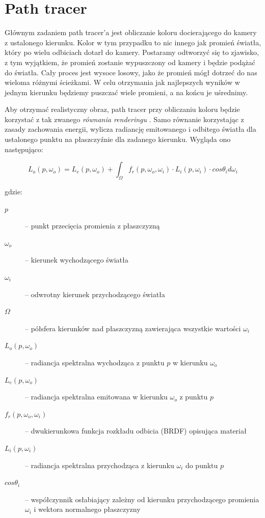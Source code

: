\documentclass[inz,shortabstract]{iithesis}
\begin{document}
    \section{Path tracer}
        Głównym zadaniem path tracer'a jest obliczanie koloru docierającego do kamery z ustalonego kierunku. Kolor w tym przypadku to nic innego jak promień światła, który po wielu odbiciach dotarł do kamery. Postaramy odtworzyć się to zjawisko, z tym wyjątkiem, że promień zostanie wypuszczony od kamery i będzie podążać do światła. Cały proces jest wysoce losowy, jako że promień mógł dotrzeć do nas wieloma różnymi ścieżkami. W celu otrzymania jak najlepszych wyników w jednym kierunku będziemy puszczać wiele promieni, a na końcu je uśrednimy.
        
        Aby otrzymać realistyczny obraz, path tracer przy obliczaniu koloru będzie korzystać z tak zwanego \textit{równania renderingu} \cite{pbrt}. Samo równanie korzystając z zasady zachowania energii, wylicza radiancję emitowanego i odbitego światła dla ustalonego punktu na płaszczyźnie dla zadanego kierunku. Wygląda ono następująco:
        
        \begin{equation*}
            L_o(p, \omega_o) = L_e(p, \omega_o) + \int_{\Omega} f_r(p, \omega_o, \omega_i) \cdot L_i(p, \omega_i) \cdot cos\theta_i d\omega_i
        \end{equation*}
        
        gdzie:
        
        \begin{description}
            \item[$p$] -- punkt przecięcia promienia z płaszczyzną
            \item[$\omega_o$] -- kierunek wychodzącego światła
            \item[$\omega_i$] -- odwrotny kierunek przychodzącego światła
            \item[$\Omega$] -- półsfera kierunków nad płaszczyzną zawierająca wszystkie wartości $\omega_i$ 
            \item[$L_o(p, \omega_o)$] -- radiancja spektralna wychodząca z punktu $p$ w kierunku $\omega_o$
            \item[$L_e(p, \omega_o)$] -- radiancja spektralna emitowana w kierunku $\omega_o$ z punktu $p$  
            \item[$f_r(p, \omega_o, \omega_i)$] -- dwukierunkowa funkcja rozkładu odbicia (BRDF) opisująca materiał
            \item[$L_i(p, \omega_i)$] -- radiancja spektralna przychodząca z kierunku $\omega_i$ do punktu $p$
            \item[$cos\theta_i$] -- współczynnik osłabiający zależny od kierunku przychodzącego promienia $\omega_i$ i wektora normalnego płaszczyzny
        \end{description}
\end{document}
